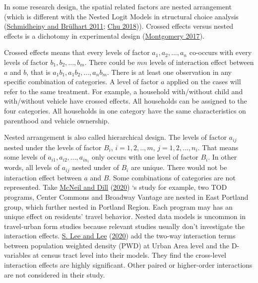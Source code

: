 \documentclass[
  11pt,
  openany]{memoir}
\begin{document}
In some research design, the spatial related factors are nested arrangement (which is different with the Nested Logit Models in structural choice analysis (\protect\hyperlink{ref-schmidheinyEquivalenceLocationChoice2011}{Schmidheiny and Brülhart 2011}; \protect\hyperlink{ref-chuImplementationNewNetwork2018}{Chu 2018})).
Crossed effects versus nested effects is a dichotomy in experimental design (\protect\hyperlink{ref-montgomeryDesignAnalysisExperiments2017}{Montgomery 2017}).

Crossed effects means that every levels of factor \(a_{1},a_{2},...,a_{n}\) co-occurs with every levels of factor \(b_{1},b_{2},...,b_{m}\).
There could be \(mn\) levels of interaction effect between \(a\) and \(b\), that is \(a_{1}b_{1},a_{1}b_{2},...,a_{n}b_{m}\).
There is at least one observation in any specific combination of categories.
A level of factor \(a\) applied on the cases will refer to the same treatment.
For example, a household with/without child and with/without vehicle have crossed effects. All households can be assigned to the four categories. All households in one category have the same characteristics on parenthood and vehicle ownership.

Nested arrangement is also called hierarchical design. The levels of factor \(a_{ij}\) nested under the levels of factor \(B_i\), \(i=1,2,..,m\), \(j=1,2,...,n_i\). That means some levels of \(a_{i1},a_{i2},...,a_{in_i}\) only occurs with one level of factor \(B_i\).
In other words, all levels of \(a_{ij}\) nested under of \(B_i\) are unique.
There would not be interaction effect between \(a\) and \(B\). Some combinations of categories are not represented.
Take \protect\hyperlink{ref-mcneilRevisitingTODsHow2020}{McNeil and Dill} (\protect\hyperlink{ref-mcneilRevisitingTODsHow2020}{2020}) `s study for example, two TOD programs, Center Commons and Broadway Vantage are nested in East Portland group, which further nested in Portland Region. Each program may has an unique effect on residents' travel behavior.
Nested data models is uncommon in travel-urban form studies because relevant studies usually don't investigate the interaction effects. \protect\hyperlink{ref-leeComparingImpactsLocal2020}{S. Lee and Lee} (\protect\hyperlink{ref-leeComparingImpactsLocal2020}{2020}) add the two-way interaction terms between population weighted density (PWD) at Urban Area level and the D-variables at census tract level into their models. They find the cross-level interaction effects are highly significant.
Other paired or higher-order interactions are not considered in their study.
\end{document}
